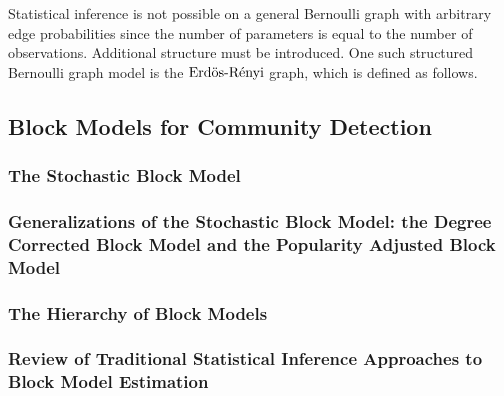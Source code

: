 \documentclass[
  11pt,
]{article}
\begin{document}
\begin{definition}
\end{definition}

Statistical inference is not possible on a general Bernoulli graph with
arbitrary edge probabilities since the number of parameters is equal to
the number of observations. Additional structure must be introduced. One
such structured Bernoulli graph model is the \(\ER\) graph, which is
defined as follows.

\begin{definition}[$\ER$ graph]
\end{definition}

\hypertarget{block-models-for-community-detection}{%
\subsection{Block Models for Community
Detection}\label{block-models-for-community-detection}}

\hypertarget{the-stochastic-block-model}{%
\subsubsection{The Stochastic Block
Model}\label{the-stochastic-block-model}}

\hypertarget{generalizations-of-the-stochastic-block-model-the-degree-corrected-block-model-and-the-popularity-adjusted-block-model}{%
\subsubsection{Generalizations of the Stochastic Block Model: the Degree
Corrected Block Model and the Popularity Adjusted Block
Model}\label{generalizations-of-the-stochastic-block-model-the-degree-corrected-block-model-and-the-popularity-adjusted-block-model}}

\hypertarget{the-hierarchy-of-block-models}{%
\subsubsection{The Hierarchy of Block
Models}\label{the-hierarchy-of-block-models}}

\hypertarget{review-of-traditional-statistical-inference-approaches-to-block-model-estimation}{%
\subsubsection{Review of Traditional Statistical Inference Approaches to
Block Model
Estimation}\label{review-of-traditional-statistical-inference-approaches-to-block-model-estimation}}
\end{document}
